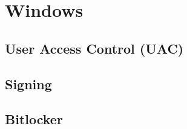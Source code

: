 
\section{Windows}
\subsection{User Access Control (UAC)}
\subsection{Signing}
\subsection{Bitlocker}